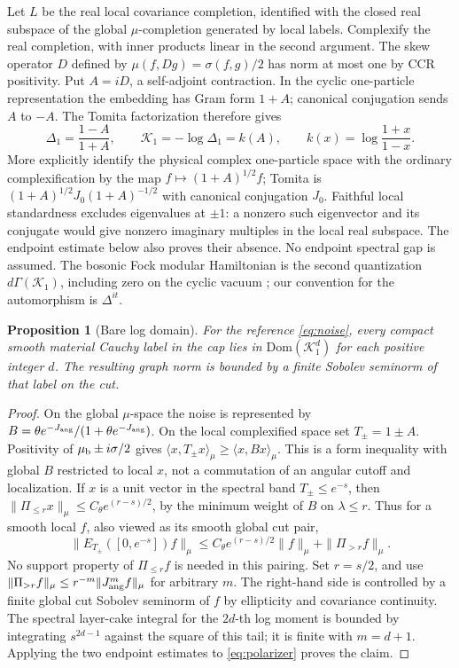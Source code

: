 \documentclass[11pt]{article}
\newtheorem{proposition}[theorem]{Proposition}
\begin{document}
Let \(L\) be the real local covariance completion, identified with the closed real subspace of the global \(\mu\)-completion generated by local labels. Complexify the real completion, with inner products linear in the second argument. The skew operator \(D\) defined by \(\mu(f,Dg)=\sigma(f,g)/2\) has norm at most one by CCR positivity. Put \(A=iD\), a self-adjoint contraction. In the cyclic one-particle representation the embedding has Gram form \(1+A\); canonical conjugation sends \(A\) to \(-A\). The Tomita factorization therefore gives
\begin{equation}
 \Delta_1=\frac{1-A}{1+A},\qquad
 \mathcal K_1=-\log\Delta_1=k(A),\qquad
 k(x)=\log\frac{1+x}{1-x}.
 \label{eq:polarizer}
\end{equation}
More explicitly identify the physical complex one-particle space with the ordinary complexification by the map \(f\mapsto(1+A)^{1/2}f\); Tomita is \((1+A)^{1/2}J_0(1+A)^{-1/2}\) with canonical conjugation \(J_0\). Faithful local standardness excludes eigenvalues at \(\pm1\): a nonzero such eigenvector and its conjugate would give nonzero imaginary multiples in the local real subspace. The endpoint estimate below also proves their absence. No endpoint spectral gap is assumed. The bosonic Fock modular Hamiltonian is the second quantization \(d\Gamma(\mathcal K_1)\), including zero on the cyclic vacuum \cite{araki,longo,longofinite}; our convention for the automorphism is \(\Delta^{it}\).

\begin{proposition}[Bare log domain]\label{prop:domain}
For the reference \eqref{eq:noise}, every compact smooth material Cauchy label in the cap lies in \(\mathrm{Dom}(\mathcal K_1^d)\) for each positive integer \(d\). The resulting graph norm is bounded by a finite Sobolev seminorm of that label on the cut.
\end{proposition}
\begin{proof}
On the global \(\mu\)-space the noise is represented by \(B=\theta e^{-J_{\rm ang}}/(1+\theta e^{-J_{\rm ang}})\). On the local complexified space set \(T_\pm=1\pm A\). Positivity of \(\mu_{\rm b}\pm i\sigma/2\) gives \(\langle x,T_\pm x\rangle_\mu\ge\langle x,Bx\rangle_\mu\). This is a form inequality with global \(B\) restricted to local \(x\), not a commutation of an angular cutoff and localization. If \(x\) is a unit vector in the spectral band \(T_\pm\le e^{-s}\), then \(\|\Pi_{\le r}x\|_\mu\le C_\theta e^{(r-s)/2}\), by the minimum weight of \(B\) on \(\lambda\le r\). Thus for a smooth local \(f\), also viewed as its smooth global cut pair,
\[
 \|E_{T_\pm}([0,e^{-s}])f\|_\mu
 \le C_\theta e^{(r-s)/2}\|f\|_\mu+\|\Pi_{>r}f\|_\mu .
\]
No support property of \(\Pi_{\le r} f\) is needed in this pairing. Set \(r=s/2\), and use
\(\|\Pi_{>r}f\|_\mu\le r^{-m}\|J_{\rm ang}^m f\|_\mu\) for arbitrary \(m\). The right-hand side is controlled by a finite global cut Sobolev seminorm of \(f\) by ellipticity and covariance continuity. The spectral layer-cake integral for the \(2d\)-th log moment is bounded by integrating \(s^{2d-1}\) against the square of this tail; it is finite with \(m=d+1\). Applying the two endpoint estimates to \eqref{eq:polarizer} proves the claim.
\end{proof}
\end{document}
